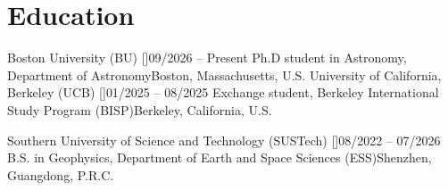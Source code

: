 \section{Education}


\resumeSubHeadingListStart
%
\resumeSubHeading
  {Boston University (BU) [\href{https://www.bu.edu/}{\faUniversity}]}{09/2026 -- Present}
  {Ph.D student in Astronomy, Department of Astronomy}{Boston, Massachusetts, U.S.}
\resumeItemListStart
\resumeItemListEnd
%
%
\resumeSubHeading
  {University of California, Berkeley (UCB) [\href{https://www.berkeley.edu/}{\faUniversity}]}{01/2025 -- 08/2025}
  {Exchange student, Berkeley International Study Program (BISP)}{Berkeley, California, U.S.}
\resumeItemListStart
  \resumeItemListEnd

\resumeSubHeading
  {Southern University of Science and Technology (SUSTech) [\href{https://www.sustech.edu.cn/}{\faUniversity}]}{08/2022 -- 07/2026}
  {B.S. in Geophysics, Department of Earth and Space Sciences (ESS)}{Shenzhen, Guangdong, P.R.C.}
\resumeItemListStart
  \resumeItemListEnd
%
\resumeSubHeadingListEnd